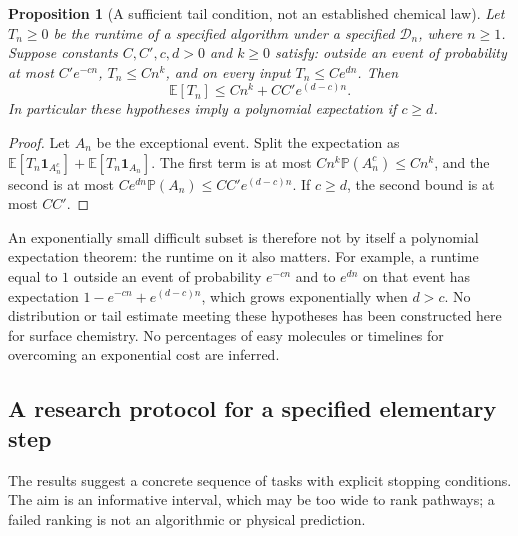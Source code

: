 \documentclass[11pt,a4paper]{article}
\theoremstyle{plain}
\newtheorem{proposition}[theorem]{Proposition}
\theoremstyle{definition}
\theoremstyle{remark}
\begin{document}
\begin{proposition}[A sufficient tail condition, not an established chemical law]
\label{prop:average}
Let $T_n\ge0$ be the runtime of a specified algorithm under a specified
$\mathcal D_n$, where $n\ge1$. Suppose constants $C,C',c,d>0$ and
$k\ge0$ satisfy: outside an event of probability at most $C'e^{-cn}$,
$T_n\le Cn^k$, and on every input $T_n\le Ce^{dn}$. Then
\[
 \mathbb E[T_n]\le Cn^k+CC'e^{(d-c)n}.
\]
In particular these hypotheses imply a polynomial expectation if $c\ge d$.
\end{proposition}
\begin{proof}
Let $A_n$ be the exceptional event. Split the expectation as
$\mathbb E[T_n\boldsymbol1_{A_n^c}]+
\mathbb E[T_n\boldsymbol1_{A_n}]$.
The first term is at most $Cn^k\mathbb P(A_n^c)\le Cn^k$, and the
second is at most $Ce^{dn}\mathbb P(A_n)\le CC'e^{(d-c)n}$.
If $c\ge d$, the second bound is at most $CC'$.
\end{proof}

An exponentially small difficult subset is therefore not by itself a
polynomial expectation theorem: the runtime on it also matters. For example,
a runtime equal to $1$ outside an event of probability $e^{-cn}$ and to
$e^{dn}$ on that event has expectation
$1-e^{-cn}+e^{(d-c)n}$, which grows exponentially when $d>c$.
No distribution or tail estimate meeting these hypotheses has been
constructed here for surface chemistry. No percentages of easy molecules or
timelines for overcoming an exponential cost are inferred.

\subsection{A research protocol for a specified elementary step}
The results suggest a concrete sequence of tasks with explicit stopping
conditions. The aim is an informative interval, which may be too wide to
rank pathways; a failed ranking is not an algorithmic or physical prediction.
\end{document}
